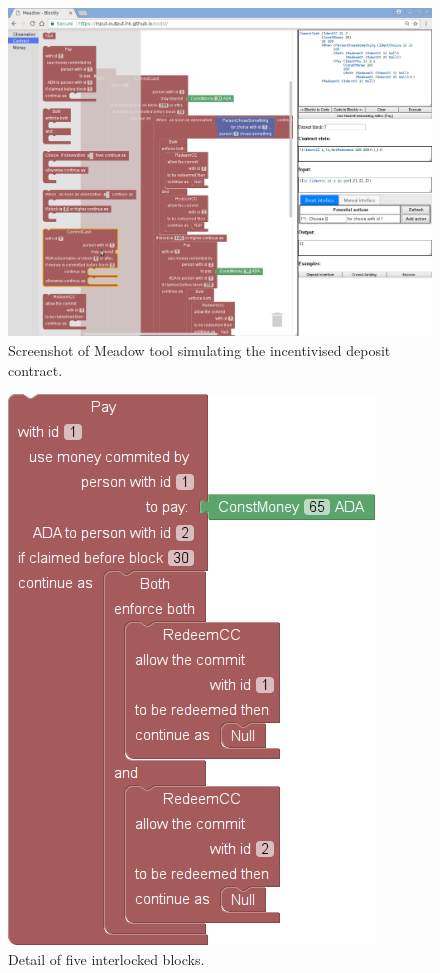 \documentclass[runningheads]{llncs}
\begin{document}
\begin{figure}
\begin{centering}
\includegraphics[width=1\textwidth]{pix/screenshot1}
\par\end{centering}
\caption{\label{fig:full-screenshot-demo}Screenshot of Meadow tool
simulating the incentivised deposit contract.}
\end{figure}

\begin{figure}
\centering{}\includegraphics[scale=0.5]{pix/detail1}\caption{\label{fig:detail-of-block}Detail of five interlocked 
blocks.}
\end{figure}
\end{document}
